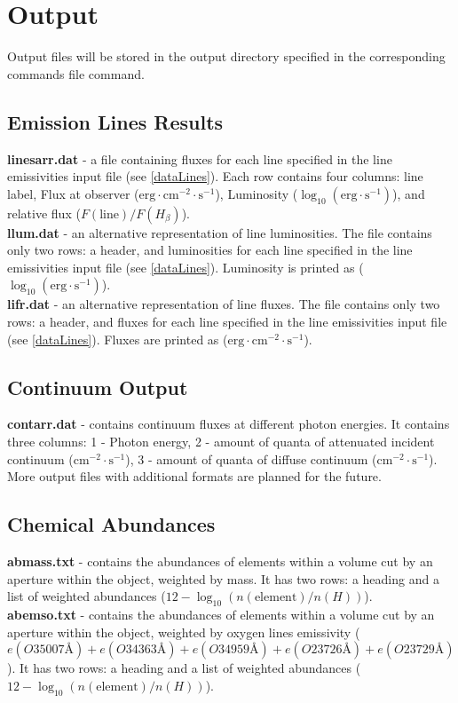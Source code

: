 \documentclass[a4paper]{article}
\begin{document}
\section{Output}
Output files will be stored in the output directory specified in the corresponding commands file command.

\subsection{Emission Lines Results}
{\bf linesarr.dat} - a file containing fluxes for each line specified in the line emissivities input file (see \ref{dataLines}).
Each row contains four columns: line label, Flux at observer ($\mathrm{erg} \cdot \mathrm{cm}^{-2} \cdot \mathrm{s}^{-1}$), Luminosity ($\log_{10}(\mathrm{erg} \cdot \mathrm{s}^{-1})$),
and relative flux ($F(\text{line})/F(H_{\beta})$).\\
{\bf llum.dat} - an alternative representation of line luminosities. The file contains only two rows: a header, and luminosities for each line specified in the line emissivities input file (see \ref{dataLines}).
Luminosity is printed as ($\log_{10}(\mathrm{erg} \cdot \mathrm{s}^{-1})$). \\
{\bf lifr.dat} - an alternative representation of line fluxes. The file contains only two rows: a header, and fluxes for each line specified in the line emissivities input file (see \ref{dataLines}).
Fluxes are printed as ($\mathrm{erg} \cdot \mathrm{cm}^{-2} \cdot \mathrm{s}^{-1}$).

\subsection{Continuum Output}
{\bf contarr.dat} - contains continuum fluxes at different photon energies. It contains three columns:
1 - Photon energy, 2 - amount of quanta of attenuated incident continuum ($\mathrm{cm}^{-2} \cdot \mathrm{s}^{-1}$), 3 - amount of quanta of diffuse continuum ($\mathrm{cm}^{-2} \cdot \mathrm{s}^{-1}$).\\

More output files with additional formats are planned for the future.

\subsection{Chemical Abundances}
{\bf abmass.txt} - contains the abundances of elements within a volume cut by an aperture within the object, weighted by mass.
It has two rows: a heading and a list of weighted abundances ($12 - \log_{10}(n(\text{element})/n(H))$). \\
{\bf abemso.txt} - contains the abundances of elements within a volume cut by an aperture within the object, weighted by oxygen
lines emissivity ($e(O3  5007\text{\AA}) + e(O3  4363\text{\AA}) + e(O3  4959\text{\AA}) + e(O2  3726\text{\AA}) + e(O2  3729\text{\AA})$).
It has two rows: a heading and a list of weighted abundances ($12 - \log_{10}(n(\text{element})/n(H))$).
\end{document}

